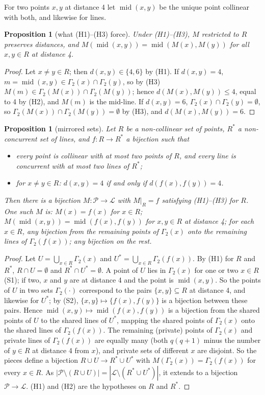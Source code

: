 \documentclass[11pt]{amsart}
\newtheorem{proposition}[theorem]{Proposition}
\theoremstyle{definition}
\theoremstyle{remark}
\numberwithin{equation}{section}
\newcommand{\mdp}{\operatorname{mid}}
\newcommand{\cL}{\mathcal L}
\newcommand{\cP}{\mathcal P}
\begin{document}
For two points $x,y$ at distance 4 let $\mdp(x,y)$ be the unique point collinear with both, and likewise for lines.

\begin{proposition}[what (H1)--(H3) force]\label{prop:mirror-nec}
Under (H1)--(H3), $M$ restricted to $R$ preserves distances, and $M(\mdp(x,y))=\mdp(M(x),M(y))$ for all $x,y\in R$ at
distance 4.
\end{proposition}

\begin{proof}
Let $x\ne y\in R$; then $d(x,y)\in\{4,6\}$ by (H1). If $d(x,y)=4$, $m=\mdp(x,y)\in\Gamma_2(x)\cap\Gamma_2(y)$, so by (H3)
$M(m)\in\Gamma_2(M(x))\cap\Gamma_2(M(y))$; hence $d(M(x),M(y))\le4$, equal to 4 by (H2), and $M(m)$ is the mid-line. If
$d(x,y)=6$, $\Gamma_2(x)\cap\Gamma_2(y)=\emptyset$, so $\Gamma_2(M(x))\cap\Gamma_2(M(y))=\emptyset$ by (H3), and
$d(M(x),M(y))=6$.
\end{proof}

\begin{proposition}[mirrored sets]\label{prop:mirror}
Let $R$ be a non-collinear set of points, $R^*$ a non-concurrent set of lines, and $f:R\to R^*$ a bijection such that
\begin{itemize}
\item[(S1)] every point is collinear with at most two points of $R$, and every line is concurrent with at most two lines of
  $R^*$;
\item[(S2)] for $x\ne y\in R$: $d(x,y)=4$ if and only if $d(f(x),f(y))=4$.
\end{itemize}
Then there is a bijection $M:\cP\to\cL$ with $M|_R=f$ satisfying (H1)--(H3) for $R$. One such $M$ is: $M(x)=f(x)$ for
$x\in R$; $M(\mdp(x,y))=\mdp(f(x),f(y))$ for $x,y\in R$ at distance 4; for each $x\in R$, any bijection from the remaining
points of $\Gamma_2(x)$ onto the remaining lines of $\Gamma_2(f(x))$; any bijection on the rest.
\end{proposition}

\begin{proof}
Let $U=\bigcup_{x\in R}\Gamma_2(x)$ and $U^*=\bigcup_{x\in R}\Gamma_2(f(x))$. By (H1) for $R$ and $R^*$, $R\cap U=\emptyset$ and
$R^*\cap U^*=\emptyset$. A point of $U$ lies in $\Gamma_2(x)$ for one or two $x\in R$ (S1); if two, $x$ and $y$ are at
distance 4 and the point is $\mdp(x,y)$. So the points of $U$ in two sets $\Gamma_2(\cdot)$ correspond to the pairs
$\{x,y\}\subseteq R$ at distance 4, and likewise for $U^*$; by (S2), $\{x,y\}\mapsto\{f(x),f(y)\}$ is a bijection between
these pairs. Hence $\mdp(x,y)\mapsto\mdp(f(x),f(y))$ is a bijection from the shared points of $U$ to the shared lines of
$U^*$, mapping the shared points of $\Gamma_2(x)$ onto the shared lines of $\Gamma_2(f(x))$. The remaining (private) points
of $\Gamma_2(x)$ and private lines of $\Gamma_2(f(x))$ are equally many (both $q(q+1)$ minus the number of $y\in R$ at distance
4 from $x$), and private sets of different $x$ are disjoint. So the pieces define a bijection $R\cup U\to R^*\cup U^*$ with
$M(\Gamma_2(x))=\Gamma_2(f(x))$ for every $x\in R$. As $|\cP\setminus(R\cup U)|=|\cL\setminus(R^*\cup U^*)|$, it extends to a
bijection $\cP\to\cL$. (H1) and (H2) are the hypotheses on $R$ and $R^*$.
\end{proof}
\end{document}
